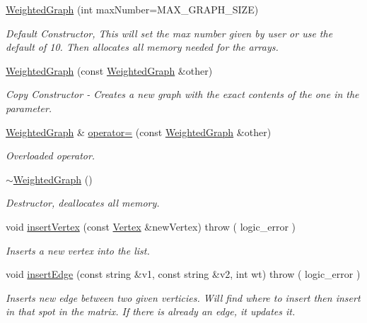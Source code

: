 \begin{DoxyCompactItemize}
\item 
\hyperlink{class_weighted_graph_a9255d382e53db8d520ef1e2b63814c81}{Weighted\+Graph} (int max\+Number=M\+A\+X\+\_\+\+G\+R\+A\+P\+H\+\_\+\+S\+I\+Z\+E)
\begin{DoxyCompactList}\small\item\em Default Constructor, This will set the max number given by user or use the default of 10. Then allocates all memory needed for the arrays. \end{DoxyCompactList}\item 
\hyperlink{class_weighted_graph_a294fd717db213e761dc0eb65bbfcb7ab}{Weighted\+Graph} (const \hyperlink{class_weighted_graph}{Weighted\+Graph} \&other)
\begin{DoxyCompactList}\small\item\em Copy Constructor -\/ Creates a new graph with the exact contents of the one in the parameter. \end{DoxyCompactList}\item 
\hyperlink{class_weighted_graph}{Weighted\+Graph} \& \hyperlink{class_weighted_graph_aa5982a507e944af28e4749cdc06543c6}{operator=} (const \hyperlink{class_weighted_graph}{Weighted\+Graph} \&other)
\begin{DoxyCompactList}\small\item\em Overloaded operator. \end{DoxyCompactList}\item 
\hyperlink{class_weighted_graph_ad7b4a5c8206772f9f4fb5906c0d64923}{$\sim$\+Weighted\+Graph} ()
\begin{DoxyCompactList}\small\item\em Destructor, deallocates all memory. \end{DoxyCompactList}\item 
void \hyperlink{class_weighted_graph_aec4ef3455e3cc0d73a42e042adb7ac40}{insert\+Vertex} (const \hyperlink{class_weighted_graph_1_1_vertex}{Vertex} \&new\+Vertex)  throw ( logic\+\_\+error )
\begin{DoxyCompactList}\small\item\em Inserts a new vertex into the list. \end{DoxyCompactList}\item 
void \hyperlink{class_weighted_graph_a6f59ad223d921324c3ec629d0d6e4eea}{insert\+Edge} (const string \&v1, const string \&v2, int wt)  throw ( logic\+\_\+error )
\begin{DoxyCompactList}\small\item\em Inserts new edge between two given verticies. Will find where to insert then insert in that spot in the matrix. If there is already an edge, it updates it. \end{DoxyCompactList}\item 

\end{DoxyCompactItemize}
